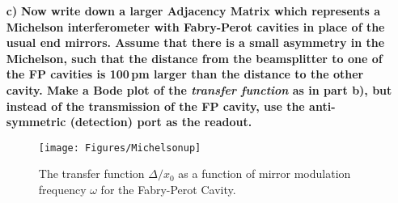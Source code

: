 \documentclass[11pt]{article}
\begin{document}
\begin{enumerate}
\begin{itemize}
The field in Eq.~\eqref{eq:ETmod} is off this form with 
\begin{align}
&E_0=G_{30}(\omega_0)E_{\rm In},& &E_{\pm}=ir_Ex_0\frac{\omega_0}{c}G_{34}(\omega_0\pm \omega)G_{20}(\omega_0)E_{\rm In}&
\end{align}
Note both $E_0$ and $E_{\pm}$ are proportional to $E_{\rm in}$. Note that both $A$ and $|E_0|^2$ are proportional to $|E_{\rm In}|^2$ or equivalently the input power $P_{\rm In}$. Hence, we can write
\begin{align}
P_T=|G_{30}(\omega_0)|^2P_{\rm In}+\Delta P\cos(\omega t+\phi),
\end{align}
where 
\begin{align}
\Delta P e^{i\phi}&=2G^*_{30}(\omega_0)ir_Ex_0\frac{\omega_0}{c}G_{34}(\omega_0+\omega)G_{20}(\omega_0)+2G_{30}(\omega_0)(ir_Ex_0\frac{\omega_0}{c}G_{34}(\omega_0-\omega)G_{20}(\omega_0))^*P_{\rm In} \nonumber \\
&=2ir_Ex_0\frac{\omega_0}{c}\left[G^*_{30}(\omega_0)G_{34}(\omega_0+\omega)G_{20}(\omega_0)-G_{30}(\omega_0)G^*_{34}(\omega_0-\omega)G^*_{20}(\omega_0)\right]P_{\rm in},
\end{align}
We consider the transfer function from modulation amplitude to power to be $\Delta P/x_0$. An attached python code computes $\Delta P/x_0$. Figure \ref{fig:2b} shows  $\Delta P/x_0$ as a function of modulation frequency $\omega$ for the parameters given in the problem.

\begin{figure}[h]
\texttt{[image: Figures/2bclose]}
\\
\texttt{[image: Figures/2bwide]}
\caption{The transfer function $\Delta /x_0$ as a function of mirror modulation frequency $\omega$ for the Fabry-Perot Cavity. Top: Close up. Bottom: Wide view.
}
\label{fig:2b}
\end{figure}

\item[\bf c)] {\bf Now write down a larger Adjacency Matrix which represents a Michelson interferometer with Fabry-Perot cavities in place of the usual end mirrors. Assume that there is a small asymmetry in the Michelson, such that the distance from the beamsplitter to one of the FP cavities is 100\,pm larger than the distance to the other cavity.
Make a Bode plot of the \emph{transfer function} as in part b), but instead of the transmission of the FP cavity, use the anti-symmetric (detection) port as the readout.}

\begin{figure}[t]
\texttt{[image: Figures/Michelsonup]}
\caption{The transfer function $\Delta /x_0$ as a function of mirror modulation frequency $\omega$ for the Fabry-Perot Cavity.
}
\label{fig:Michelson}
\end{figure}


\end{itemize}
\end{enumerate}
\end{document}
